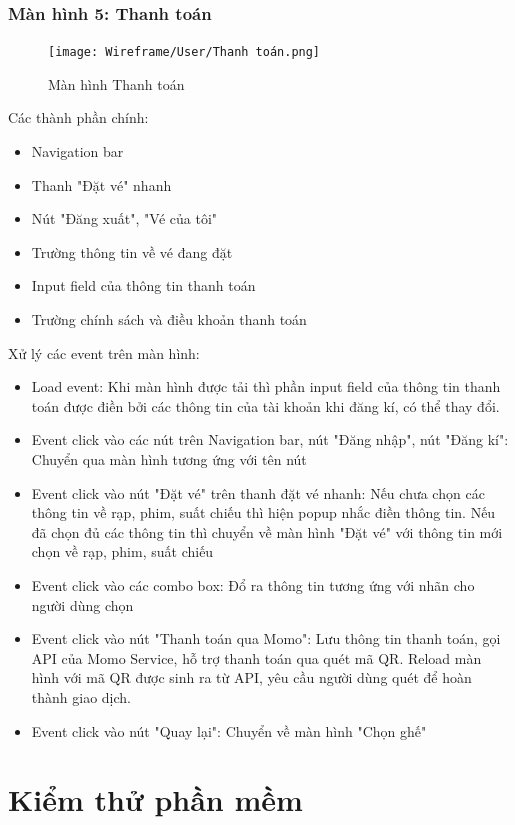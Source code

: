 \documentclass[a4paper, 12pt]{article}
\begin{document}
		\subsubsection{Màn hình 5: Thanh toán}
			\begin{figure}[H]
				\begin{center}
					\texttt{[image: Wireframe/User/Thanh toán.png]}
					\caption{Màn hình Thanh toán}
				\end{center}
			\end{figure}
			Các thành phần chính: 
			\begin{itemize}
				\item Navigation bar
				\item Thanh "Đặt vé" nhanh
				\item Nút "Đăng xuất", "Vé của tôi"
				\item Trường thông tin về vé đang đặt
				\item Input field của thông tin thanh toán
				\item Trường chính sách và điều khoản thanh toán
			\end{itemize}
			Xử lý các event trên màn hình:
			\begin{itemize}
				\item Load event: Khi màn hình được tải thì phần input field của thông tin thanh toán được điền bởi các thông tin của tài khoản khi đăng kí, có thể thay đổi.
				\item Event click vào các nút trên Navigation bar, nút "Đăng nhập", nút "Đăng kí": Chuyển qua màn hình tương ứng với tên nút
				\item Event click vào nút "Đặt vé" trên thanh đặt vé nhanh: Nếu chưa chọn các thông tin về rạp, phim, suất chiếu thì hiện popup nhắc điền thông tin. Nếu đã chọn đủ các thông tin thì chuyển về màn hình "Đặt vé" với thông tin mới chọn về rạp, phim, suất chiếu
				\item Event click vào các combo box: Đổ ra thông tin tương ứng với nhãn cho người dùng chọn
				\item Event click vào nút "Thanh toán qua Momo": Lưu thông tin thanh toán, gọi API của Momo Service, hỗ trợ thanh toán qua quét mã QR. Reload màn hình với mã QR được sinh ra từ API, yêu cầu người dùng quét để hoàn thành giao dịch.
				\item Event click vào nút "Quay lại": Chuyển về màn hình "Chọn ghế"
			\end{itemize}

\clearpage

\section{Kiểm thử phần mềm}
\end{document}

